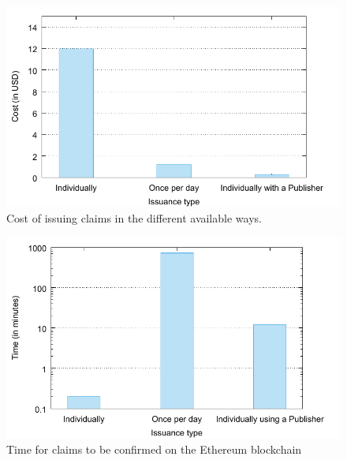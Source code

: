 \documentclass[letterpaper,twocolumn,10pt]{article}
\begin{document}
\begin{figure}[t]
  \centering
  \includegraphics[width=\columnwidth]{final-figures/publisher-issuing-price.pdf}
  \vspace{-10pt}
  \caption{Cost of issuing claims in the different available ways.}
  \label{fig:costpublishers}
\end{figure}

\begin{figure}[t]
  \centering
  \includegraphics[width=\columnwidth]{final-figures/publisher-issuing-time.pdf}
  \vspace{-10pt}
  \caption{Time for claims to be confirmed on the Ethereum blockchain}
  \label{fig:timepublishers}
\end{figure}
\end{document}
